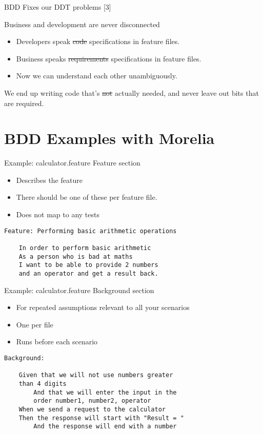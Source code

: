 \documentclass[bigger]{beamer}
\begin{document}
\begin{frame}[label={sec:orgcd814bd}]{BDD Fixes our DDT problems [3]}
\begin{block}{Business and development are \alert{never} disconnected}
\begin{itemize}
\item Developers speak \sout{code} specifications in feature files.
\item Business speaks \sout{requirements} specifications in feature files.
\item Now we can understand each other unambiguously.
\end{itemize}
We end up writing code that's \sout{not} actually needed, and \alert{never} leave out bits that are required.
\end{block}
\end{frame}
\section{BDD Examples with Morelia}
\label{sec:orge378039}
\begin{frame}[fragile,label={sec:orgc3b157f}]{Example: calculator.feature Feature section}
 \begin{itemize}
\item Describes the feature
\item There should be one of these per feature file.
\item Does not map to any tests
\end{itemize}
\scriptsize
\begin{verbatim}
Feature: Performing basic arithmetic operations

    In order to perform basic arithmetic
    As a person who is bad at maths
    I want to be able to provide 2 numbers
    and an operator and get a result back.
\end{verbatim}
\end{frame}

\begin{frame}[fragile,label={sec:org067d44e}]{Example: calculator.feature Background section}
 \begin{itemize}
\item For repeated assumptions relevant to all your scenarios
\item One per file
\item Runs before each scenario
\end{itemize}
\scriptsize
\begin{verbatim}
Background:

    Given that we will not use numbers greater
    than 4 digits
        And that we will enter the input in the
        order number1, number2, operator
    When we send a request to the calculator
    Then the response will start with "Result = "
        And the response will end with a number

\end{verbatim}
\end{frame}
\end{document}
